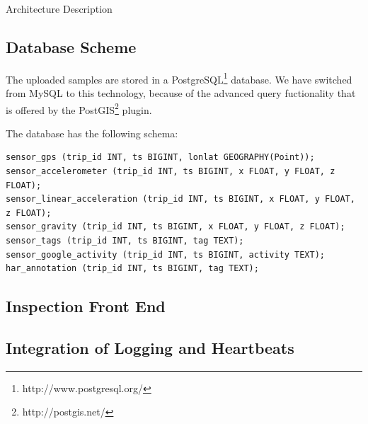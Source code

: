 Architecture Description

\subsection{Database Scheme}

The uploaded samples are stored in a
PostgreSQL\footnote{http://www.postgresql.org/} database. We have
switched from MySQL to this technology, because of the advanced query
fuctionality that is offered by the
PostGIS\footnote{http://postgis.net/} plugin.

The database has the following schema:
{\small
\begin{verbatim}
sensor_gps (trip_id INT, ts BIGINT, lonlat GEOGRAPHY(Point));
sensor_accelerometer (trip_id INT, ts BIGINT, x FLOAT, y FLOAT, z FLOAT);
sensor_linear_acceleration (trip_id INT, ts BIGINT, x FLOAT, y FLOAT, z FLOAT);
sensor_gravity (trip_id INT, ts BIGINT, x FLOAT, y FLOAT, z FLOAT);
sensor_tags (trip_id INT, ts BIGINT, tag TEXT);
sensor_google_activity (trip_id INT, ts BIGINT, activity TEXT);
har_annotation (trip_id INT, ts BIGINT, tag TEXT);
\end{verbatim}}

\subsection{Inspection Front End}


\subsection{Integration of Logging and Heartbeats}




